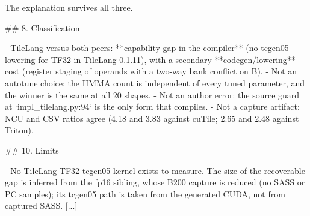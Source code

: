 \begin{promptbox}
The explanation survives all three.

## 8. Classification

- TileLang versus both peers: **capability gap in the compiler** (no tcgen05 lowering for TF32 in TileLang 0.1.11), with a secondary **codegen/lowering** cost (register staging of operands with a two-way bank conflict on B).
- Not an autotune choice: the HMMA count is independent of every tuned parameter, and the winner is the same at all 20 shapes.
- Not an author error: the source guard at `impl_tilelang.py:94` is the only form that compiles.
- Not a capture artifact: NCU and CSV ratios agree (4.18 and 3.83 against cuTile; 2.65 and 2.48 against Triton).

## 10. Limits

- No TileLang TF32 tcgen05 kernel exists to measure. The size of the recoverable gap is inferred from the fp16 sibling, whose B200 capture is reduced (no SASS or PC samples); its tcgen05 path is taken from the generated CUDA, not from captured SASS.
[...]
\end{promptbox}

